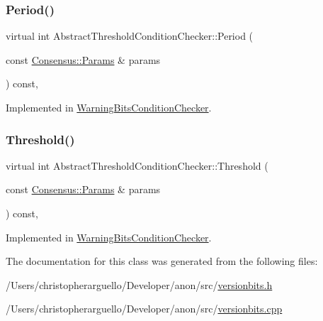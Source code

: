 \subsubsection{\texorpdfstring{Period()}{Period()}}
{\footnotesize\ttfamily virtual int Abstract\+Threshold\+Condition\+Checker\+::\+Period (\begin{DoxyParamCaption}\item[{const \mbox{\hyperlink{chainparams_8h_a5e1ca1b35c3dd1a4e20f18445f28dd9c}{Consensus\+::\+Params}} \&}]{params }\end{DoxyParamCaption}) const\hspace{0.3cm}{\ttfamily [protected]}, {}}



Implemented in \mbox{\hyperlink{class_warning_bits_condition_checker_af6dd78109426020b259b70c07bc858d7}{Warning\+Bits\+Condition\+Checker}}.

\mbox{\label{class_abstract_threshold_condition_checker_ad01c87d6d551e9d801661d734a270a6c}} 
\subsubsection{\texorpdfstring{Threshold()}{Threshold()}}
{\footnotesize\ttfamily virtual int Abstract\+Threshold\+Condition\+Checker\+::\+Threshold (\begin{DoxyParamCaption}\item[{const \mbox{\hyperlink{chainparams_8h_a5e1ca1b35c3dd1a4e20f18445f28dd9c}{Consensus\+::\+Params}} \&}]{params }\end{DoxyParamCaption}) const\hspace{0.3cm}{\ttfamily [protected]}, {}}



Implemented in \mbox{\hyperlink{class_warning_bits_condition_checker_af2de7b32547b0677594b1bfbdacd19ad}{Warning\+Bits\+Condition\+Checker}}.



The documentation for this class was generated from the following files\+:\begin{DoxyCompactItemize}
\item 
/\+Users/christopherarguello/\+Developer/anon/src/\mbox{\hyperlink{versionbits_8h}{versionbits.\+h}}\item 
/\+Users/christopherarguello/\+Developer/anon/src/\mbox{\hyperlink{versionbits_8cpp}{versionbits.\+cpp}}\end{DoxyCompactItemize}
